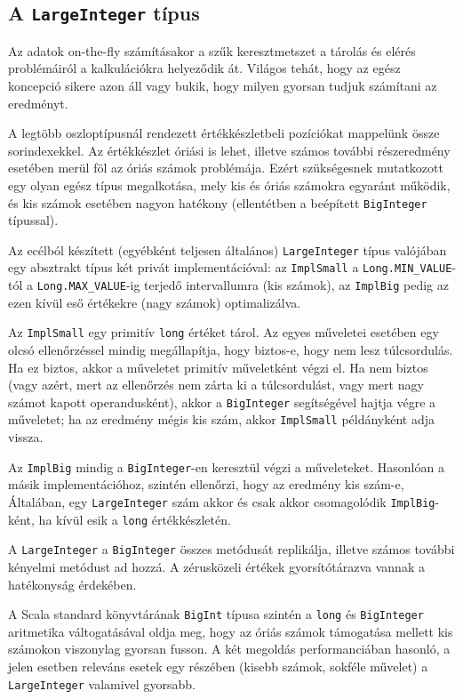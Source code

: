 \documentclass[
    parspace,
    noindent,
    nohyp,
]{elteiktdk}[2023/04/10]
\begin{document}
\subsection{A \texttt{LargeInteger} típus}

Az adatok on-the-fly számításakor a szűk keresztmetszet
a tárolás és elérés problémáiról a kalkulációkra helyeződik át.
Világos tehát, hogy az egész koncepció sikere azon áll vagy bukik,
hogy milyen gyorsan tudjuk számítani az eredményt.

A legtöbb oszloptípusnál rendezett értékkészletbeli pozíciókat mappelünk össze sorindexekkel.
Az értékkészlet óriási is lehet,
illetve számos további részeredmény esetében merül föl az óriás számok problémája.
Ezért szükségesnek mutatkozott egy olyan egész típus megalkotása,
mely kis és óriás számokra egyaránt működik,
és kis számok esetében nagyon hatékony (ellentétben a beépített \texttt{BigInteger} típussal).

Az ecélból készített (egyébként teljesen általános) \texttt{LargeInteger} típus
valójában egy absztrakt típus két privát implementációval:
az \texttt{ImplSmall} a \texttt{Long.MIN\_VALUE}-tól a \texttt{Long.MAX\_VALUE}-ig
terjedő intervallumra (kis számok),
az \texttt{ImplBig} pedig az ezen kívül eső értékekre (nagy számok) optimalizálva.

Az \texttt{ImplSmall} egy primitív \texttt{long} értéket tárol.
Az egyes műveletei esetében egy olcsó ellenőrzéssel mindig megállapítja,
hogy biztos-e, hogy nem lesz túlcsordulás.
Ha ez biztos, akkor a műveletet primitív műveletként végzi el.
Ha nem biztos
(vagy azért, mert az ellenőrzés nem zárta ki a túlcsordulást,
vagy mert nagy számot kapott operandusként),
akkor a \texttt{BigInteger} segítségével hajtja végre a műveletet;
ha az eredmény mégis kis szám, akkor \texttt{ImplSmall} példányként adja vissza.

Az \texttt{ImplBig} mindig a \texttt{BigInteger}-en keresztül végzi a műveleteket.
Hasonlóan a másik implementációhoz, szintén ellenőrzi, hogy az eredmény kis szám-e,
Általában, egy \texttt{LargeInteger} szám akkor és csak akkor csomagolódik \texttt{ImplBig}-ként,
ha kívül esik a \texttt{long} értékkészletén.

A \texttt{LargeInteger} a \texttt{BigInteger} összes metódusát replikálja,
illetve számos további kényelmi metódust ad hozzá.
A zérusközeli értékek gyorsítótárazva vannak a hatékonyság érdekében.

A Scala standard könyvtárának \texttt{BigInt} típusa szintén a \texttt{long} és \texttt{BigInteger}
aritmetika váltogatásával oldja meg,
hogy az óriás számok támogatása mellett kis számokon viszonylag gyorsan fusson.
A két megoldás performanciában hasonló,
a jelen esetben releváns esetek egy részében (kisebb számok, sokféle művelet)
a \texttt{LargeInteger} valamivel gyorsabb.
\end{document}
